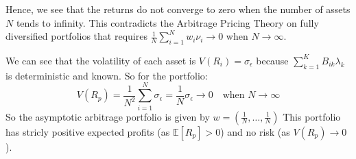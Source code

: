 \documentclass[10pt]{article}
\newcommand{\Ebb}{\mathbb{E}}
\newenvironment{exercise}[2][Exercise]{\begin{trivlist}
  \item[\hskip \labelsep {\bfseries #1}\hskip \labelsep {\bfseries #2.}]}{\end{trivlist}}
\begin{document}
\begin{exercise}{1}
\begin{itemize}
    Hence, we see that the returns do not converge to zero when the number of assets $N$ tends to infinity. This contradicts the Arbitrage Pricing Theory on fully diversified portfolios that requires $ \frac{1}{N}\sum_{i=1}^Nw_i\nu_i \rightarrow 0$ when $N \rightarrow \infty$.  

    We can see that the volatility of each asset is $V(R_i) = \sigma_{\epsilon}$ because $\sum_{k=1}^KB_{ik}\lambda_k$ is deterministic and known. 
    So for the portfolio: 
    $$ V(R_p) = \frac{1}{N^2}\sum_{i=1}^N\sigma_{\epsilon} = \frac{1}{N}\sigma_\epsilon \rightarrow 0 \quad \text{when } N \rightarrow \infty$$
    So the asymptotic arbitrage portfolio is given by $w = (\frac{1}{N},\dots,\frac{1}{N})$ 
    This portfolio has stricly positive expected profits (as $\Ebb[R_p] > 0$) and no risk (as $V(R_p)\rightarrow 0$).
  \end{itemize}
	
\end{exercise}
  
\end{document}
